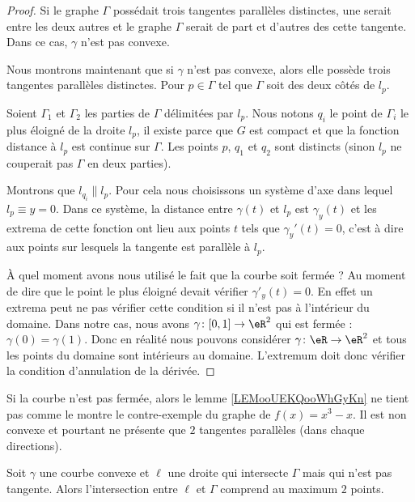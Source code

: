 \begin{proof}
    Si le graphe \( \Gamma\) possédait trois tangentes parallèles distinctes, une serait entre les deux autres et le graphe \( \Gamma\) serait de part et d'autres des cette tangente. Dans ce cas, \( \gamma\) n'est pas convexe.

    Nous montrons maintenant que si \( \gamma\) n'est pas convexe, alors elle possède trois tangentes parallèles distinctes. Pour \( p\in \Gamma\) tel que \( \Gamma\) soit des deux côtés de \( l_p\).

    Soient \( \Gamma_1\) et \( \Gamma_2\) les parties de \( \Gamma\) délimitées par \( l_p\). Nous notons \( q_i\) le point de \( \Gamma_i\) le plus éloigné de la droite \( l_p\), il existe parce que \( G\) est compact et que la fonction distance à \( l_p\) est continue sur \( \Gamma\). Les points \( p\), \( q_1\) et \( q_2\) sont distincts (sinon \( l_p\) ne couperait pas \( \Gamma\) en deux parties).

    Montrons que \( l_{q_i}\parallel l_p\). Pour cela nous choisissons un système d'axe dans lequel \( l_p\equiv y=0\). Dans ce système, la distance entre \( \gamma(t)\) et \( l_p\) est \( \gamma_y(t)\) et les extrema de cette fonction ont lieu aux points \( t\) tels que \( \gamma_y'(t)=0\), c'est à dire aux points sur lesquels la tangente est parallèle à \( l_p\).

    À quel moment avons nous utilisé le fait que la courbe soit fermée ? Au moment de dire que le point le plus éloigné devait vérifier \( \gamma'_y(t)=0\). En effet un extrema peut ne pas vérifier cette condition si il n'est pas à l'intérieur du domaine. Dans notre cas, nous avons \( \gamma\colon \mathopen[ 0 , 1 \mathclose]\to \eR^2\) qui est fermée :  \( \gamma(0)=\gamma(1)\). Donc en réalité nous pouvons considérer \( \gamma\colon \eR\to \eR^2\) et tous les points du domaine sont intérieurs au domaine. L'extremum doit donc vérifier la condition d'annulation de la dérivée.
\end{proof}

\begin{example}
    Si la courbe n'est pas fermée, alors le lemme \ref{LEMooUEKQooWhGyKn} ne tient pas comme le montre le contre-exemple du graphe de \( f(x)=x^3-x\). Il est non convexe et pourtant ne présente que \( 2\) tangentes parallèles (dans chaque directions).
\end{example}

\begin{lemma}       \label{LEMooCSXCooIDPiKW}
    Soit \( \gamma\) une courbe convexe et \( \ell\) une droite qui intersecte \( \Gamma\) mais qui n'est pas tangente. Alors l'intersection entre \( \ell\) et \( \Gamma\) comprend au maximum \( 2\) points.
\end{lemma}

